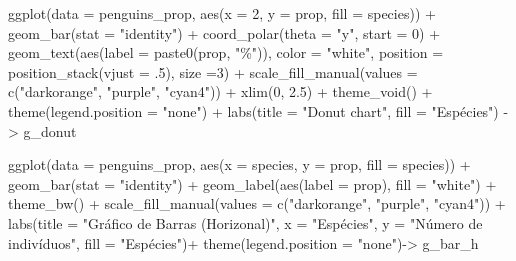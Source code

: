 \documentclass[
]{book}
\newenvironment{Shaded}{\begin{snugshade}}{\end{snugshade}}
\newcommand{\AttributeTok}[1]{\textcolor[rgb]{0.61,0.61,0.61}{#1}}
\newcommand{\DecValTok}[1]{\textcolor[rgb]{0.06,0.06,0.06}{#1}}
\newcommand{\FloatTok}[1]{\textcolor[rgb]{0.06,0.06,0.06}{#1}}
\newcommand{\FunctionTok}[1]{\textcolor[rgb]{0,0,0}{#1}}
\newcommand{\NormalTok}[1]{#1}
\newcommand{\OtherTok}[1]{\textcolor[rgb]{0.37,0.37,0.37}{#1}}
\newcommand{\SpecialCharTok}[1]{\textcolor[rgb]{0,0,0}{#1}}
\newcommand{\StringTok}[1]{\textcolor[rgb]{0.5,0.5,0.5}{#1}}
\begin{document}
\begin{Shaded}
\begin{Highlighting}[]
\FunctionTok{ggplot}\NormalTok{(}\AttributeTok{data =}\NormalTok{ penguins\_prop, }\FunctionTok{aes}\NormalTok{(}\AttributeTok{x =} \DecValTok{2}\NormalTok{, }\AttributeTok{y =}\NormalTok{ prop, }\AttributeTok{fill =}\NormalTok{ species)) }\SpecialCharTok{+}
  \FunctionTok{geom\_bar}\NormalTok{(}\AttributeTok{stat =} \StringTok{"identity"}\NormalTok{) }\SpecialCharTok{+}
  \FunctionTok{coord\_polar}\NormalTok{(}\AttributeTok{theta =} \StringTok{"y"}\NormalTok{, }\AttributeTok{start =} \DecValTok{0}\NormalTok{) }\SpecialCharTok{+}
  \FunctionTok{geom\_text}\NormalTok{(}\FunctionTok{aes}\NormalTok{(}\AttributeTok{label =} \FunctionTok{paste0}\NormalTok{(prop, }\StringTok{"\%"}\NormalTok{)), }\AttributeTok{color =} \StringTok{"white"}\NormalTok{,}
            \AttributeTok{position =} \FunctionTok{position\_stack}\NormalTok{(}\AttributeTok{vjust =}\NormalTok{ .}\DecValTok{5}\NormalTok{), }\AttributeTok{size =}\DecValTok{3}\NormalTok{) }\SpecialCharTok{+}
  \FunctionTok{scale\_fill\_manual}\NormalTok{(}\AttributeTok{values =} \FunctionTok{c}\NormalTok{(}\StringTok{"darkorange"}\NormalTok{, }\StringTok{"purple"}\NormalTok{, }\StringTok{"cyan4"}\NormalTok{)) }\SpecialCharTok{+}
  \FunctionTok{xlim}\NormalTok{(}\DecValTok{0}\NormalTok{, }\FloatTok{2.5}\NormalTok{) }\SpecialCharTok{+}
  \FunctionTok{theme\_void}\NormalTok{() }\SpecialCharTok{+}
  \FunctionTok{theme}\NormalTok{(}\AttributeTok{legend.position =} \StringTok{"none"}\NormalTok{) }\SpecialCharTok{+}
  \FunctionTok{labs}\NormalTok{(}\AttributeTok{title =} \StringTok{"Donut chart"}\NormalTok{, }\AttributeTok{fill =} \StringTok{"Espécies"}\NormalTok{) }\OtherTok{{-}\textgreater{}}\NormalTok{ g\_donut}


\FunctionTok{ggplot}\NormalTok{(}\AttributeTok{data =}\NormalTok{ penguins\_prop, }
       \FunctionTok{aes}\NormalTok{(}\AttributeTok{x =}\NormalTok{ species, }\AttributeTok{y =}\NormalTok{ prop, }\AttributeTok{fill =}\NormalTok{ species)) }\SpecialCharTok{+}
  \FunctionTok{geom\_bar}\NormalTok{(}\AttributeTok{stat =} \StringTok{"identity"}\NormalTok{) }\SpecialCharTok{+}
  \FunctionTok{geom\_label}\NormalTok{(}\FunctionTok{aes}\NormalTok{(}\AttributeTok{label =}\NormalTok{ prop), }
             \AttributeTok{fill =} \StringTok{"white"}\NormalTok{) }\SpecialCharTok{+}
  \FunctionTok{theme\_bw}\NormalTok{() }\SpecialCharTok{+}
  \FunctionTok{scale\_fill\_manual}\NormalTok{(}\AttributeTok{values =} \FunctionTok{c}\NormalTok{(}\StringTok{"darkorange"}\NormalTok{, }\StringTok{"purple"}\NormalTok{, }\StringTok{"cyan4"}\NormalTok{)) }\SpecialCharTok{+}
  \FunctionTok{labs}\NormalTok{(}\AttributeTok{title =} \StringTok{"Gráfico de Barras (Horizonal)"}\NormalTok{, }\AttributeTok{x =} \StringTok{"Espécies"}\NormalTok{, }\AttributeTok{y =} \StringTok{"Número de indivíduos"}\NormalTok{, }\AttributeTok{fill =} \StringTok{"Espécies"}\NormalTok{)}\SpecialCharTok{+}
  \FunctionTok{theme}\NormalTok{(}\AttributeTok{legend.position =} \StringTok{"none"}\NormalTok{)}\OtherTok{{-}\textgreater{}}\NormalTok{ g\_bar\_h}


\end{Highlighting}
\end{Shaded}
\end{document}
